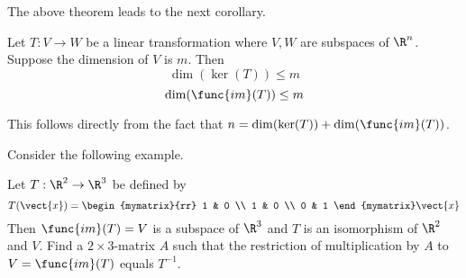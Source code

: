 The above theorem leads to the next corollary.

\begin{corollary}{}{}
Let $T:V\rightarrow W$ be a linear transformation where $V,W$ are subspaces of $\R^n$. Suppose the dimension of $V$ is $m$. Then
\[
\dim (\ker (T)) \leq m
\]
\[
\dim (\func{im}(T)) \leq m
\]
\end{corollary}

This follows directly from the fact that $n=\dim (\ker (T)) +\dim (\func{im}(
T))$.

Consider the following example.

\begin{example}{}{}
Let $T:\R^{2}\rightarrow \R^{3}$ be defined by
\begin{equation*}
T(\vect{x})=\begin{mymatrix}{rr}
1 & 0 \\
1 & 0 \\
0 & 1
\end{mymatrix} \vect{x}
\end{equation*}
Then $\func{im}(T) =V$ is a subspace of $\R^{3}$ and $T$
is an isomorphism of $\R^{2}$ and $V$. Find a $2\times 3$-matrix $A$
such that the restriction of multiplication by $A$ to $V=\func{im}(
T) $ equals $T^{-1}$.
\end{example}

